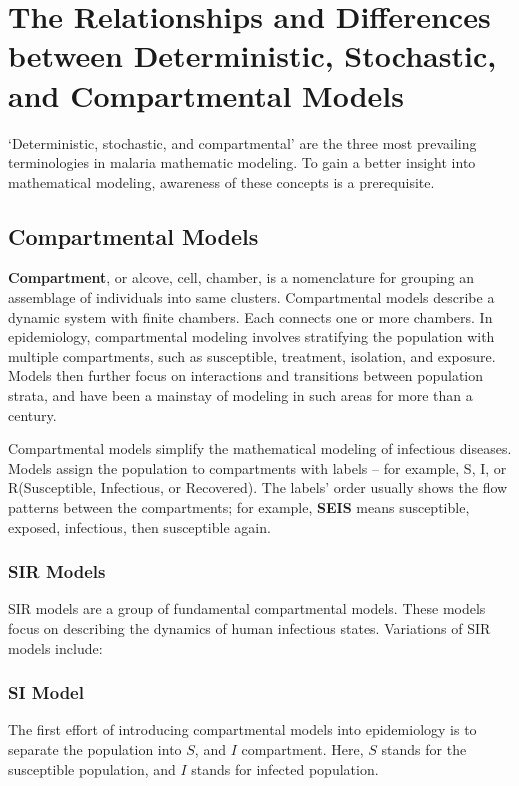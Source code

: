 \documentclass[a4paper, 12pt, twoside]{report}
\begin{document}
\section{The Relationships and Differences between Deterministic, Stochastic, and Compartmental Models}
`Deterministic, stochastic, and compartmental' are the three most prevailing terminologies in malaria mathematic modeling.
To gain a better insight into mathematical modeling, awareness of these concepts is a prerequisite.

\subsection{Compartmental Models}%
\label{subsubsec:compartmental}
\textbf{Compartment}, or alcove, cell, chamber, is a nomenclature for grouping an assemblage of individuals into same clusters.
Compartmental models describe a dynamic system with finite chambers.
Each connects one or more chambers.
In epidemiology, compartmental modeling involves stratifying the population with multiple compartments, such as susceptible, treatment, isolation, and exposure.
Models then further focus on interactions and transitions between population strata, and have been a mainstay of modeling in such areas for more than a century.

Compartmental models simplify the mathematical modeling of infectious diseases.
Models assign the population to compartments with labels – for example, S, I, or R(Susceptible, Infectious, or Recovered).
The labels' order usually shows the flow patterns between the compartments; for example, \textbf{SEIS} means susceptible, exposed, infectious, then susceptible again.

\subsubsection{SIR Models}
SIR models are a group of fundamental compartmental models.
These models focus on describing the dynamics of human infectious states.
Variations of SIR models include:

\subsubsection{SI Model}
The first effort of introducing compartmental models into epidemiology is to separate the population into $S$, and $I$ compartment.
Here, $S$ stands for the susceptible population, and $I$ stands for infected population.
\end{document}
